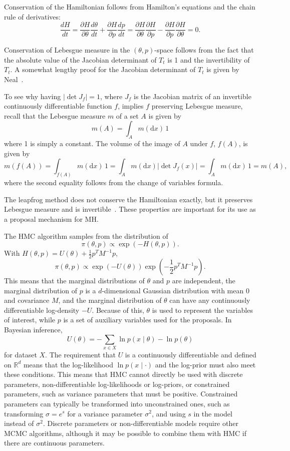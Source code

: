 \documentclass[english,twoside,openright]{HYgraduMLDS}
\newcommand{\R}{\mathbb{R}}
\newcommand{\dx}{\mathrm{d}}
\begin{document}
Conservation of the Hamiltonian follows from Hamilton's equations and the 
chain rule of derivatives:
\[
    \frac{dH}{dt} = \frac{\partial H}{\partial \theta}\frac{d \theta}{dt}
    + \frac{\partial H}{\partial p}\frac{dp}{dt}
    = \frac{\partial H}{\partial \theta}\frac{\partial H}{\partial p}
    - \frac{\partial H}{\partial p}\frac{\partial H}{\partial \theta}
    = 0.
\]

Conservation of Lebesgue measure in the \((\theta, p)\)-space follows
from the fact that 
the absolute value of the Jacobian determinant of \(T_t\) is 1 and the 
invertibility of \(T_t\). A somewhat
lengthy proof for the Jacobian determinant of \(T_t\) is given by
Neal~\cite{neal2012mcmc}. 

To see why 
having \(|\det J_f| = 1\), where \(J_f\) is the Jacobian matrix of an invertible
continuously differentiable function \(f\), 
implies \(f\) preserving Lebesgue measure, recall that the Lebesgue measure
\(m\) of a set \(A\) is given by
\[
    m(A) = \int_A m(\dx x)\, 1
\]
where 1 is simply a constant.
The volume of the image of \(A\) under \(f\), \(f(A)\), is given by
\[
  m(f(A)) = \int_{f(A)}m(\dx x)\,1
  = \int_{A}m(\dx x)|\det J_f(x)| = \int_A m(\dx x)\,1
  = m(A),
\]
where the second equality follows from the change of variables formula.

The leapfrog method does not conserve the Hamiltonian exactly, but it 
preserves Lebesgue measure and is invertible~\cite{neal2012mcmc}.
These properties are important for its use as a proposal mechanism for MH.

The HMC algorithm samples from the distribution of~\cite{neal2012mcmc}
\[
    \pi(\theta, p) \propto \exp(-H(\theta, p)).
\]
With \(H(\theta, p) = U(\theta) + \frac{1}{2}p^{T}M^{-1}p\),
\[
    \pi(\theta, p) \propto \exp(-U(\theta))\exp\left(-\frac{1}{2}p^{T}M^{-1}p\right).
\]
This means that the marginal distributions of \(\theta\) and \(p\) are 
independent, the marginal distribution of \(p\) is a \(d\)-dimensional
Gaussian distribution 
with mean 0 and covariance \(M\), and the marginal distribution of
\(\theta\) can have any continuously differentiable log-density \(-U\).
Because of this, \(\theta\) is used to represent the variables of interest,
while \(p\) is a set of auxiliary variables used for the proposals.
In Bayesian inference,
\[
  U(\theta) = -\sum_{x\in X}\ln p(x\mid \theta) - \ln p(\theta)
\]
for dataset \(X\). The requirement that \(U\) is a continuously differentiable
and defined on \(\R^{d}\) means that the log-likelihood \(\ln p(x\mid \cdot)\)
and the log-prior must also meet these conditions. This means that HMC cannot directly
be used with discrete parameters, non-differentiable log-likelihoods or log-priors,
or constrained parameters, such as variance
parameters that must be positive. Constrained parameters can typically be
transformed into unconstrained ones, such as transforming \(\sigma = e^{s}\)
for a variance parameter \(\sigma^{2}\), and using \(s\) in the model instead
of \(\sigma^{2}\). Discrete parameters or non-differentiable models
require other MCMC algorithms, although it may be possible to combine them
with HMC if there are continuous parameters.
\end{document}
